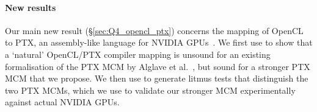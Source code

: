 \paragraph{New results} Our main new result
(\S\ref{sec:Q4_opencl_ptx}) concerns the mapping of OpenCL to PTX,
an assembly-like language for NVIDIA GPUs~\cite{nvidia15}. We
first use  to show that a `natural' OpenCL/PTX compiler mapping is
unsound for an existing formalisation of the PTX MCM by Alglave et
al.~\cite{alglave+15}, but sound for a stronger PTX MCM that we
propose. We then use  to generate litmus tests that distinguish the
two PTX MCMs, which we use to validate our stronger MCM experimentally
against actual NVIDIA GPUs.















